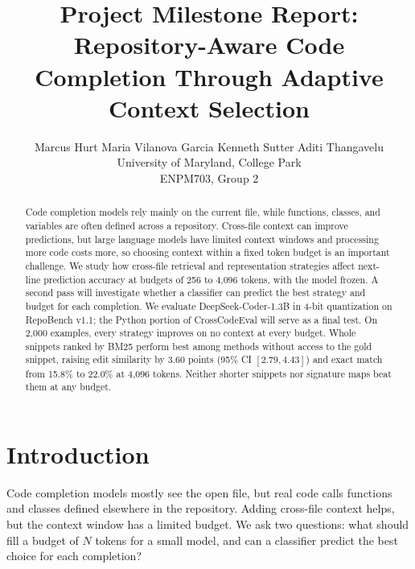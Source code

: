 \documentclass[10pt,twocolumn,letterpaper]{article}
\begin{document}
\title{Project Milestone Report:\\
Repository-Aware Code Completion Through Adaptive Context Selection}

\author{Marcus Hurt \quad Maria Vilanova Garcia \quad Kenneth Sutter \quad Aditi Thangavelu\\
University of Maryland, College Park\\
ENPM703, Group 2
}

\maketitle

\begin{abstract}
   Code completion models rely mainly on the current file, while functions, classes, and
   variables are often defined across a repository. Cross-file context can improve
   predictions, but large language models have limited context windows and processing more
   code costs more, so choosing context within a fixed token budget is an important
   challenge. We study how cross-file retrieval and representation strategies affect
   next-line prediction accuracy at budgets of 256 to 4,096 tokens, with the model frozen.
   A second pass will investigate whether a classifier can predict the best strategy and
   budget for each completion. We evaluate DeepSeek-Coder-1.3B in 4-bit quantization on
   RepoBench v1.1; the Python portion of CrossCodeEval will serve as a final test. On 2,000
   examples, every strategy improves on no context at every budget. Whole snippets ranked
   by BM25 perform best among methods without access to the gold snippet, raising edit
   similarity by 3.60 points (95\% CI $[2.79, 4.43]$) and exact match from 15.8\% to 22.0\%
   at 4,096 tokens. Neither shorter snippets nor signature maps beat them at any budget.
\end{abstract}

\section{Introduction}

Code completion models mostly see the open file, but real code calls functions and classes
defined elsewhere in the repository. Adding cross-file context helps, but the context window
has a limited budget. We ask two questions: what should fill a budget of $N$ tokens for a
small model, and can a classifier predict the best choice for each completion?
\end{document}
